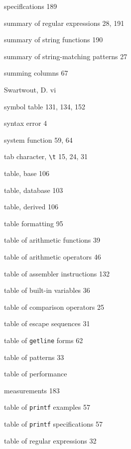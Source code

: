 \begin{multicols}{3}
\hangindent=3pc  speciflcations 189

\hangindent=3pc  summary of regular expressions 28, 191

\hangindent=3pc  summary of string functions 190

\hangindent=3pc  summary of string-matching patterns 27

\hangindent=3pc  summing columns 67

\hangindent=3pc  Swartwout, D. vi

\hangindent=3pc  symbol table 131, 134, 152

\hangindent=3pc  syntax error 4

\hangindent=3pc  system function 59, 64

\hangindent=3pc  tab character, \verb'\t' 15, 24, 31

\hangindent=3pc  table, base 106

\hangindent=3pc  table, database 103

\hangindent=3pc  table, derived 106

\hangindent=3pc  table formatting 95

\hangindent=3pc  table of arithmetic functions 39

\hangindent=3pc  table of arithmetic operators 46

\hangindent=3pc  table of assembler instructions 132

\hangindent=3pc  table of built-in variables 36

\hangindent=3pc  table of comparison operators 25

\hangindent=3pc  table of escape sequences 31

\hangindent=3pc  table of \verb'getline' forms 62

\hangindent=3pc  table of patterns 33

\hangindent=3pc  table of performance

\hangindent=3pc  measurements 183

\hangindent=3pc  table of \verb'printf' examples 57

\hangindent=3pc  table of \verb'printf' specifications 57

\hangindent=3pc  table of regular expressions 32


\end{multicols}
